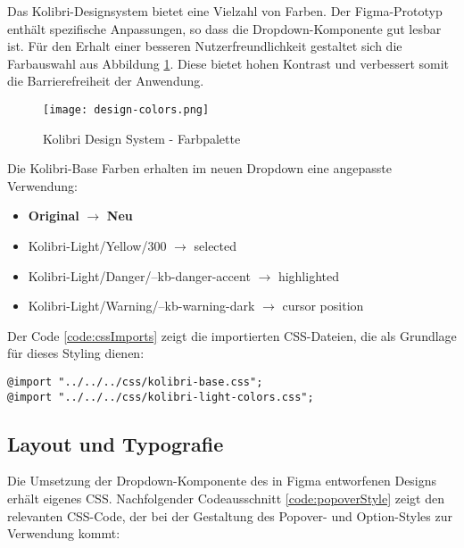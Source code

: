Das Kolibri-Designsystem bietet eine Vielzahl von Farben.
Der Figma-Prototyp enthält spezifische Anpassungen, so dass die Dropdown-Komponente gut lesbar ist.
Für den Erhalt einer besseren Nutzerfreundlichkeit gestaltet sich die Farbauswahl aus Abbildung \ref{img:designColors}.
Diese bietet hohen Kontrast und verbessert somit die Barrierefreiheit der Anwendung.

\begin{figure}[!htb]
    \centering
    \texttt{[image: design-colors.png]}
    \caption{Kolibri Design System - Farbpalette}
    \label{img:designColors}
\end{figure}

\noindent
Die Kolibri-Base Farben erhalten im neuen Dropdown eine angepasste Verwendung:

\begin{itemize}
    \item \textbf{Original} $\rightarrow$ \textbf{Neu}
    \item Kolibri-Light/Yellow/300 $\rightarrow$ selected
    \item Kolibri-Light/Danger/--kb-danger-accent $\rightarrow$ highlighted
    \item Kolibri-Light/Warning/--kb-warning-dark $\rightarrow$ cursor position
\end{itemize}

\noindent
Der Code \ref{code:cssImports} zeigt die importierten CSS-Dateien, die als Grundlage für dieses Styling dienen:

\begin{lstlisting}[style = htmlcssjs, caption = CSS Imports, label = code:cssImports]
@import "../../../css/kolibri-base.css";
@import "../../../css/kolibri-light-colors.css";
\end{lstlisting}


\subsection{Layout und Typografie}
\label{sec:layoutTypo}

Die Umsetzung der Dropdown-Komponente des in Figma entworfenen Designs erhält eigenes CSS.
Nachfolgender Codeausschnitt \ref{code:popoverStyle} zeigt den relevanten CSS-Code, der bei der Gestaltung des Popover- und Option-Styles zur Verwendung kommt:

